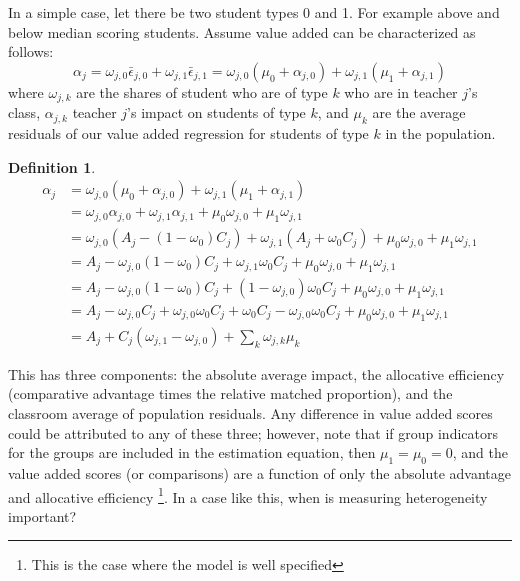 \documentclass[12pt]{article}
\theoremstyle{definition}
\theoremstyle{definition}
\theoremstyle{definition}
\theoremstyle{definition}
\newtheorem{definition}{Definition}
\begin{document}
    In a simple case, let there be two student types 0 and 1. For example above and below median scoring students. Assume value added can be characterized as follows:
    \[
    \alpha_j = \omega_{j,0}\bar{\epsilon}_{j,0}  + \omega_{j,1}\bar{\epsilon}_{j,1} =  \omega_{j,0}(\mu_0 +\alpha_{j,0}) + \omega_{j,1}(\mu_1 +\alpha_{j,1})
    \]
    \noindent where $\omega_{j,k}$ are the shares of student who are of type $k$ who are in teacher $j$'s class, $\alpha_{j,k}$ teacher $j$'s  impact on students of type $k$, and $\mu_k$ are the average residuals of our value added regression for students of type $k$ in the population.
    
    \begin{definition}
    \label{hetero_decomp}
    \begin{align*}
        \alpha_j  &= \omega_{j,0}(\mu_0 +\alpha_{j,0}) + \omega_{j,1}(\mu_1 +\alpha_{j,1})  \\
                  & =  \omega_{j,0}\alpha_{j,0} + \omega_{j,1}\alpha_{j,1}   +\mu_0 \omega_{j,0} + \mu_1 \omega_{j,1}  \\
                  & =  \omega_{j,0}(A_j -(1-\omega_{0})C_j) + \omega_{j,1}(A_j +\omega_{0}C_j)  +\mu_0 \omega_{j,0} + \mu_1 \omega_{j,1} \\
                  & =  A_j   - \omega_{j,0} (1-\omega_{0})C_j + \omega_{j,1}\omega_{0}C_j +\mu_0 \omega_{j,0} + \mu_1 \omega_{j,1} \\
                  & =  A_j   - \omega_{j,0} (1-\omega_{0})C_j + (1-\omega_{j,0})\omega_{0}C_j +\mu_0 \omega_{j,0} + \mu_1 \omega_{j,1} \\
                  & =  A_j   - \omega_{j,0} C_j +\omega_{j,0}\omega_{0}C_j + \omega_{0}C_j -\omega_{j,0}\omega_{0}C_j +\mu_0 \omega_{j,0} + \mu_1 \omega_{j,1} \\
                  & =  A_j  + C_j  ( \omega_{j,1} - \omega_{j,0} ) + \sum_k  \omega_{j,k} \mu_k
    \end{align*}
    \end{definition}

    
    This has three components: the absolute average impact, the allocative efficiency (comparative advantage times the relative matched proportion), and the classroom average of population residuals. Any difference in value added scores could be attributed to any of these three; however, note that if group indicators for the groups are included in the estimation equation, then $\mu_1 = \mu_0 = 0$, and the value added scores (or comparisons) are a function of only the absolute advantage and allocative efficiency \footnote{This is the case where the model is well specified}. In a case like this, when is measuring heterogeneity important? 
    
\end{document}
